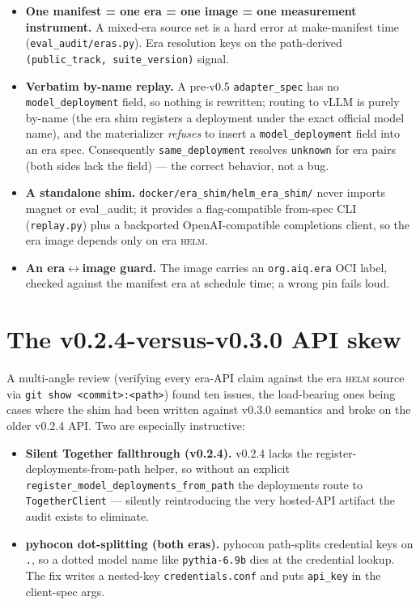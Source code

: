 \documentclass[11pt]{report}
\newcommand{\code}[1]{\texttt{#1}}
\begin{document}
\begin{itemize}[nosep]
  \item \textbf{One manifest = one era = one image = one measurement instrument.} A
        mixed-era source set is a hard error at make-manifest time
        (\code{eval\_audit/eras.py}). Era resolution keys on the path-derived
        \code{(public\_track, suite\_version)} signal.
  \item \textbf{Verbatim by-name replay.} A pre-v0.5 \code{adapter\_spec} has no
        \code{model\_deployment} field, so nothing is rewritten; routing to vLLM is
        purely by-name (the era shim registers a deployment under the exact official
        model name), and the materializer \emph{refuses} to insert a
        \code{model\_deployment} field into an era spec. Consequently
        \code{same\_deployment} resolves \code{unknown} for era pairs (both sides
        lack the field) --- the correct behavior, not a bug.
  \item \textbf{A standalone shim.} \code{docker/era\_shim/helm\_era\_shim/} never
        imports magnet or eval\_audit; it provides a flag-compatible from-spec CLI
        (\code{replay.py}) plus a backported OpenAI-compatible completions client, so
        the era image depends only on era \textsc{helm}.
  \item \textbf{An era$\leftrightarrow$image guard.} The image carries an
        \code{org.aiq.era} OCI label, checked against the manifest era at schedule
        time; a wrong pin fails loud.
\end{itemize}

\section{The v0.2.4-versus-v0.3.0 API skew}

A multi-angle review (verifying every era-API claim against the era \textsc{helm}
source via \code{git show <commit>:<path>}) found ten issues, the load-bearing ones
being cases where the shim had been written against v0.3.0 semantics and broke on
the older v0.2.4 API. Two are especially instructive:

\begin{itemize}[nosep]
  \item \textbf{Silent Together fallthrough (v0.2.4).} v0.2.4 lacks the
        register-deployments-from-path helper, so without an explicit
        \code{register\_model\_deployments\_from\_path} the deployments route to
        \code{TogetherClient} --- silently reintroducing the very hosted-API
        artifact the audit exists to eliminate.
  \item \textbf{pyhocon dot-splitting (both eras).} pyhocon path-splits credential
        keys on \code{.}, so a dotted model name like \code{pythia-6.9b} dies at the
        credential lookup. The fix writes a nested-key \code{credentials.conf} and
        puts \code{api\_key} in the client-spec args.
\end{itemize}
\end{document}

